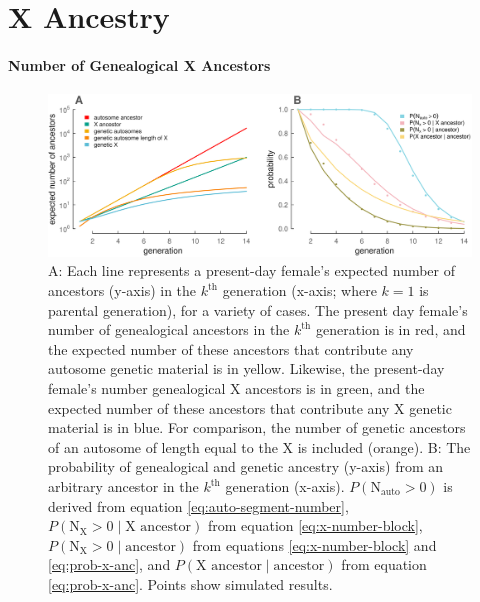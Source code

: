 \documentclass[11pt]{article}
\begin{document}
\section{X Ancestry}
\label{sec:x-ancestry}

\paragraph{Number of Genealogical X Ancestors}

  \begin{figure}[!ht]
    \centering
    \includegraphics[width=\textwidth]{images/num-ancestors}

    \caption{A: Each line represents a present-day female's expected number of
      ancestors (y-axis) in the $k^\text{th}$ generation (x-axis; where $k=1$
      is parental generation), for a variety of cases. The present day female's
      number of genealogical ancestors in the $k^\text{th}$ generation is in
      red, and the expected number of these ancestors that contribute any
      autosome genetic material is in yellow. Likewise, the present-day
      female's number genealogical X ancestors is in green, and the expected
      number of these ancestors that contribute any X genetic material is in
      blue. For comparison, the number of genetic ancestors of an autosome of
      length equal to the X is included (orange). B: The probability of
      genealogical and genetic ancestry (y-axis) from an arbitrary ancestor in
      the $k^\text{th}$ generation (x-axis). $P(\text{N}_\text{auto} > 0)$ is
      derived from equation \eqref{eq:auto-segment-number},
      $P(\text{N}_\text{X} > 0 \;|\; \text{X ancestor})$ from equation
      \eqref{eq:x-number-block}, $P(\text{N}_\text{X} > 0 \;|\;
      \text{ancestor})$ from equations \eqref{eq:x-number-block} and
    \eqref{eq:prob-x-anc}, and $P(\text{X ancestor} \;|\; \text{ancestor})$
  from equation \eqref{eq:prob-x-anc}. Points show simulated results.}

\label{fig:num-ancestors}
\end{figure}
\end{document}
